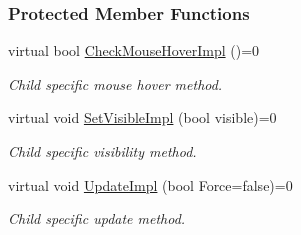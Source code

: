 \subsubsection*{Protected Member Functions}
\begin{DoxyCompactItemize}
\item 
\hypertarget{classMezzanine_1_1UI_1_1Cell_af0ee8e775513f8e99dc84e88be16639b}{
virtual bool \hyperlink{classMezzanine_1_1UI_1_1Cell_af0ee8e775513f8e99dc84e88be16639b}{CheckMouseHoverImpl} ()=0}
\label{classMezzanine_1_1UI_1_1Cell_af0ee8e775513f8e99dc84e88be16639b}

\begin{DoxyCompactList}\small\item\em Child specific mouse hover method. \item\end{DoxyCompactList}\item 
\hypertarget{classMezzanine_1_1UI_1_1Cell_a9d8dfaaeac0cfff40e39467760d4df66}{
virtual void \hyperlink{classMezzanine_1_1UI_1_1Cell_a9d8dfaaeac0cfff40e39467760d4df66}{SetVisibleImpl} (bool visible)=0}
\label{classMezzanine_1_1UI_1_1Cell_a9d8dfaaeac0cfff40e39467760d4df66}

\begin{DoxyCompactList}\small\item\em Child specific visibility method. \item\end{DoxyCompactList}\item 
\hypertarget{classMezzanine_1_1UI_1_1Cell_ac0f9370055c6e74cebc67ecd6e84b284}{
virtual void \hyperlink{classMezzanine_1_1UI_1_1Cell_ac0f9370055c6e74cebc67ecd6e84b284}{UpdateImpl} (bool Force=false)=0}
\label{classMezzanine_1_1UI_1_1Cell_ac0f9370055c6e74cebc67ecd6e84b284}

\begin{DoxyCompactList}\small\item\em Child specific update method. \item\end{DoxyCompactList}\end{DoxyCompactItemize}
